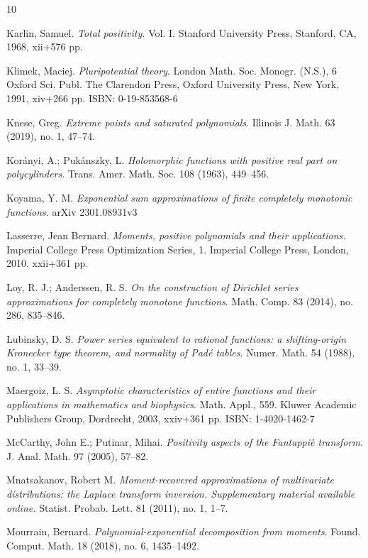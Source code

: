 \documentclass[11pt,reqno]{amsart}
\theoremstyle{plain}
\theoremstyle{definition}
\numberwithin{equation}{section}
\begin{document}
\begin{thebibliography}{10}
        
		 Karlin, Samuel. {\em Total positivity.} Vol. I. Stanford University Press, Stanford, CA, 1968, xii+576 pp. 

         Klimek, Maciej. {\em Pluripotential theory}. London Math. Soc. Monogr. (N.S.), 6 Oxford Sci. Publ.
         The Clarendon Press, Oxford University Press, New York, 1991, xiv+266 pp.
          ISBN: 0-19-853568-6

           Knese, Greg. {\em Extreme points and saturated polynomials}. Illinois J. Math. 63 (2019), no. 1, 47–74.
		
		 Kor\'anyi, A.; Puk\'anszky, L. {\em Holomorphic functions with positive real part on polycylinders}. Trans. Amer. Math. Soc. 108 (1963), 449--456.
		
		 Koyama, Y. M. {\em Exponential sum approximations of finite completely monotonic functions}. arXiv 2301.08931v3
		
		Lasserre, Jean Bernard. {\em Moments, positive polynomials and their applications.} Imperial College Press Optimization Series, 1. Imperial College Press, London, 2010. xxii+361 pp.
		
		 Loy, R. J.; Anderssen, R. S. {\em On the construction of Dirichlet series approximations for completely monotone functions}. Math. Comp. 83 (2014), no. 286, 835–846.
		
		 Lubinsky, D. S. {\em Power series equivalent to rational functions: a shifting-origin Kronecker type theorem, and normality of Padé tables}.
		Numer. Math. 54 (1988), no. 1, 33–39.
		
		 Maergoiz, L. S. {\em Asymptotic characteristics of entire functions and their applications in mathematics and biophysics}. Math. Appl., 559. Kluwer Academic Publishers Group, Dordrecht, 2003, xxiv+361 pp.
ISBN: 1-4020-1462-7



McCarthy, John E.; Putinar, Mihai. {\em Positivity aspects of the Fantappi\`{e} transform}. J. Anal. Math. 97 (2005), 57--82.

 Mnatsakanov, Robert M. {\em Moment-recovered approximations of multivariate distributions: the Laplace transform inversion. Supplementary material available online.} Statist. Probab. Lett. 81 (2011), no. 1, 1--7.
		
		 Mourrain, Bernard. {\em Polynomial-exponential decomposition from moments}. Found. Comput. Math. 18 (2018), no. 6, 1435–1492.
		

\end{thebibliography}
\end{document}
